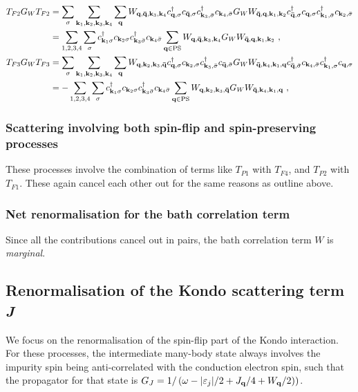 \documentclass[reprint,hidelinks,onecolumn]{revtex4-2}
\begin{document}
\begin{equation}\begin{aligned}
	T_{F2} G_W T_{F2} &= \sum_\sigma\sum_{{\bf k}_1, {\bf k}_2, {\bf k}_3, {\bf k}_4} \sum_{\bf q}W_{{\bf q},{\bf \bar q},{\bf k}_3,{\bf k}_4} c^\dagger_{{\bf q},\sigma}c_{{\bf \bar q},\sigma}c^\dagger_{{\bf k}_3,\bar\sigma}c_{{\bf k}_4,\bar\sigma} G_W W_{{\bf \bar q},{\bf q},{\bf k}_1,{\bf k}_2} c^\dagger_{{\bf \bar q},\sigma}c_{{\bf q},\sigma}c^\dagger_{{\bf k}_1,\bar\sigma}c_{{\bf k}_2,\bar\sigma} \\
							  &= \sum_{1,2,3,4}\sum_\sigma c^\dagger_{{\bf k}_1\sigma} c_{{\bf k}_2\sigma} c^\dagger_{{\bf k}_3\bar\sigma} c_{{\bf k}_4\bar \sigma} \sum_{\bf q \in \text{PS}} W_{{\bf q},{\bf \bar q},{\bf k}_3,{\bf k}_4} G_W W_{{\bf \bar q},{\bf q},{\bf k}_1,{\bf k}_2}~,\\
	T_{F3} G_W T_{F3} &= \sum_\sigma\sum_{{\bf k}_1, {\bf k}_2, {\bf k}_3, {\bf k}_4} \sum_{\bf q} W_{{\bf q},{\bf k}_2,{\bf k}_3,{\bf \bar q}} c^\dagger_{{\bf q},\sigma}c_{{\bf k}_2,\sigma}c^\dagger_{{\bf k}_3,\bar\sigma}c_{{\bf \bar q},\bar\sigma} G_W W_{{\bf \bar q},{\bf k}_4,{\bf k}_1,{\bf q}} c^\dagger_{{\bf \bar q},\bar\sigma} c_{{\bf k}_4,\bar\sigma} c^\dagger_{{\bf k}_1,\sigma} c_{{\bf q},\sigma} \\
							  &= -\sum_{1,2,3,4}\sum_\sigma c^\dagger_{{\bf k}_1\sigma} c_{{\bf k}_2\sigma} c^\dagger_{{\bf k}_3\bar\sigma} c_{{\bf k}_4\bar \sigma} \sum_{\bf q \in \text{PS}} W_{{\bf q},{\bf k}_2,{\bf k}_3,{\bf \bar q}} G_W W_{{\bf \bar q},{\bf k}_4,{\bf k}_1,{\bf q}}~,
\end{aligned}\end{equation}

\subsubsection*{Scattering involving both spin-flip and spin-preserving processes}
These processes involve the combination of terms like \(T_{P1}\) with \(T_{F4}\), and \(T_{P2}\) with \(T_{F1}\). These again cancel each other out for the same reasons as outline above.

\subsubsection*{Net renormalisation for the bath correlation term}
Since all the contributions cancel out in pairs, the bath correlation term \(W\) is {\it marginal}.

\subsection{Renormalisation of the Kondo scattering term {\it J}}
We focus on the renormalisation of the spin-flip part of the Kondo interaction. For these processes, the intermediate many-body state always involves the impurity spin being anti-correlated with the conduction electron spin, such that the propagator for that state is \(G_J = 1/\left(\omega - |\varepsilon_j|/2 + J_{\bf q}/4 + W_{\bf q}/2)\right) \).
\end{document}
